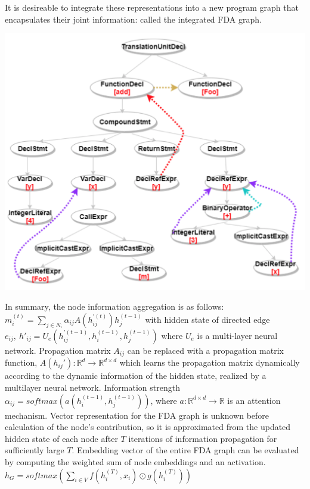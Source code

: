 \documentclass{article}
\begin{document}
It is desireable to integrate these representations into a new program graph that encapsulates their joint information: called the integrated FDA graph.
\centerline{\includegraphics[width=\columnwidth]{Images/Similarity2-6.png}}
In summary, the node information aggregation is as follows:
$m_i^{(t)} = \sum\limits_{j \in N_i}\alpha_{ij} A(h_{ij}^{'(t)}) h_j^{(t-1)}$ with hidden state of directed edge $e_{ij}, \ h'_{ij} = U_e(h_{ij}^{'(t-1)}, h_i^{(t-1)}, h_j^{(t-1)})$ where $U_e$ is a multi-layer neural network.
Propagation matrix $A_{ij}$ can be replaced with a propagation matrix function, $A(h_{ij}') : \mathbb{R}^d \rightarrow \mathbb{R}^{d \times d}$ which learns the propagation matrix dynamically according to the dynamic information of the hidden state, realized by a multilayer neural network.
Information strength $\alpha_{ij} = softmax(a(h_i^{(t-1)}, h_j^{(t-1)}))$, where $a : \mathbb{R}^{d \times d} \rightarrow \mathbb{R}$ is an attention mechanism.
Vector representation for the FDA graph is unknown before calculation of the node's contribution, so it is approximated from the updated hidden state of each node after $T$ iterations of information propagation for sufficiently large $T$.
Embedding vector of the entire FDA graph can be evaluated by computing the weighted sum of node embeddings and an activation.
$h_G = softmax(\sum\limits_{i \in V}f(h_i^{(T)}, x_i) \odot g(h_i^{(T)}))$
\end{document}

